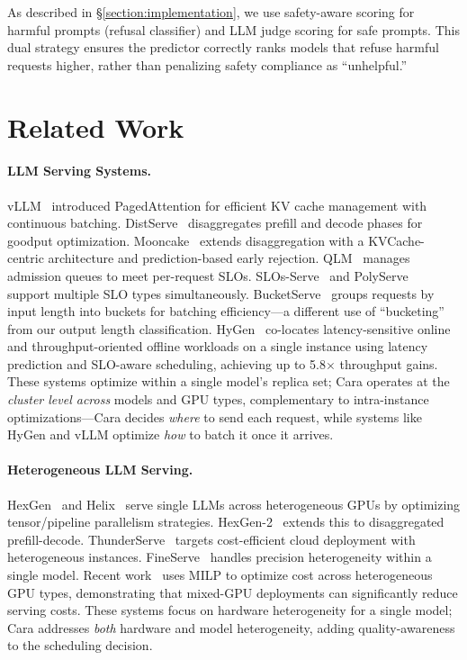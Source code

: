 \documentclass[letterpaper, anonymous, twocolumn, 10pt]{article}
\begin{document}
As described in \S\ref{section:implementation}, we use safety-aware scoring for harmful prompts (refusal classifier) and LLM judge scoring for safe prompts.
This dual strategy ensures the predictor correctly ranks models that refuse harmful requests higher, rather than penalizing safety compliance as ``unhelpful.''


\section{Related Work}\label{section:related_work}

\paragraph{LLM Serving Systems.}
vLLM~\cite{kwon2023vllm} introduced PagedAttention for efficient KV cache management with continuous batching.
DistServe~\cite{zhong2024distservedisaggregatingprefilldecoding} disaggregates prefill and decode phases for goodput optimization.
Mooncake~\cite{qin_mooncake_2024} extends disaggregation with a KVCache-centric architecture and prediction-based early rejection.
QLM~\cite{qlm} manages admission queues to meet per-request SLOs.
SLOs-Serve~\cite{chen2025slosserveoptimizedservingmultislo} and PolyServe~\cite{shi2025polyserveefficientmultislo} support multiple SLO types simultaneously.
BucketServe~\cite{bucketserve2025} groups requests by input length into buckets for batching efficiency---a different use of ``bucketing'' from our output length classification.
HyGen~\cite{hygen2025} co-locates latency-sensitive online and throughput-oriented offline workloads on a single instance using latency prediction and SLO-aware scheduling, achieving up to 5.8$\times$ throughput gains.
These systems optimize within a single model's replica set; Cara operates at the \emph{cluster level across} models and GPU types, complementary to intra-instance optimizations---Cara decides \emph{where} to send each request, while systems like HyGen and vLLM optimize \emph{how} to batch it once it arrives.

\paragraph{Heterogeneous LLM Serving.}
HexGen~\cite{hexgen} and Helix~\cite{helix} serve single LLMs across heterogeneous GPUs by optimizing tensor/pipeline parallelism strategies.
HexGen-2~\cite{hexgen-2} extends this to disaggregated prefill-decode.
ThunderServe~\cite{thunderserve} targets cost-efficient cloud deployment with heterogeneous instances.
FineServe~\cite{bin2025fineserveprecisionawarekvslab} handles precision heterogeneity within a single model.
Recent work~\cite{demystifyinghetgpu2025} uses MILP to optimize cost across heterogeneous GPU types, demonstrating that mixed-GPU deployments can significantly reduce serving costs.
These systems focus on hardware heterogeneity for a single model; Cara addresses \emph{both} hardware and model heterogeneity, adding quality-awareness to the scheduling decision.
\end{document}
